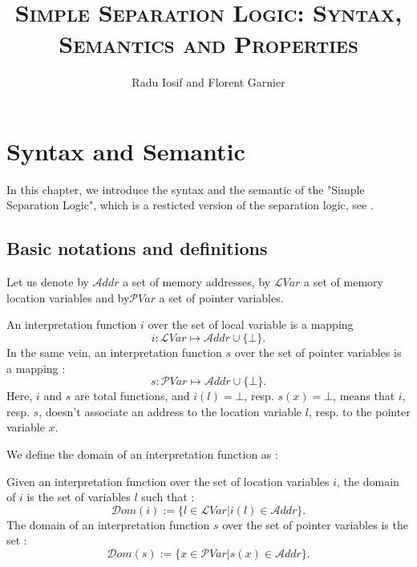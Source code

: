 \documentclass[a4paper,twoside,12pt]{report}
\newcommand{\defeq}[0]{:=}
\newcommand{\Dom}[1]{\mathcal{D}om(#1)}
\newcommand\Addr{\mathcal{A}ddr} %
\newcommand\LVar{\mathcal{L}Var} %
\newcommand\PVar{\mathcal{P}Var} %
\begin{document}


\author{Radu Iosif and Florent Garnier}
\begin{titlepage}
\title{\Huge\textsc{Simple Separation Logic: Syntax, Semantics and Properties}}
\maketitle
\end{titlepage}



\lstset{
basicstyle=\footnotesize,
language=Caml
}

\chapter{Syntax and Semantic}

In this chapter, we introduce the syntax and the semantic of the "Simple Separation Logic", which is a resticted version of the separation logic, see \cite{Reynolds02separationlogic:}. 

\section{Basic notations and definitions}

Let us denote by $\Addr$ a set of memory addresses, by $\LVar$ a set of memory location variables and  by$\PVar$ a set of pointer variables.

\begin{definition}
An interpretation function $i$ over the set of local variable is a mapping
$$i: \LVar \mapsto \Addr \cup \lbrace \bot \rbrace.$$
In the same vein, an interpretation function $s$ over the set of pointer
variables is a mapping :
$$s: \PVar \mapsto \Addr \cup \lbrace \bot \rbrace.$$
Here, $i$ and $s$ are total functions, and $i(l)=\bot$, resp. $s(x)=\bot$, means
that $i$, resp. $s$, doesn't associate an address to the location variable $l$, resp. to the pointer variable $x$.
\end{definition}

We define the domain of an interpretation function as :
\begin{definition}[Domain]
Given an interpretation function over the set of location variables $i$, 
the domain of $i$ is the set of variables $l$ such that : 
$$\Dom{i}\defeq \lbrace l \in \LVar | i(l)\in \Addr \rbrace.$$
The domain of an interpretation function $s$ over the set of pointer
variables is the set :
$$\Dom{s}\defeq \lbrace x \in \PVar | s(x) \in \Addr \rbrace.$$
\end{definition}
\end{document}
